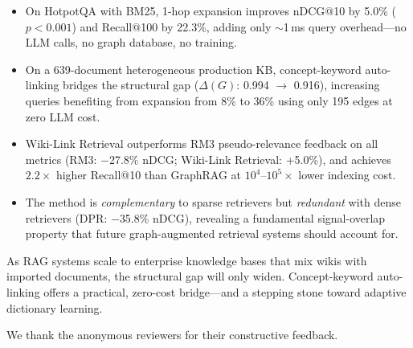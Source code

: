\documentclass[sigconf,review]{acmart}
\newcommand{\sys}{Wiki-Link Retrieval\xspace}
\begin{document}
\begin{itemize}
  \item On HotpotQA with BM25, 1-hop expansion improves nDCG@10 by 5.0\%
($p < 0.001$) and Recall@100 by 22.3\%, adding only ${\sim}$1\,ms
query overhead---no LLM calls, no graph database, no training.

  \item On a 639-document heterogeneous production KB, concept-keyword
auto-linking bridges the structural gap ($\Delta(G)$: 0.994 $\to$ 0.916),
increasing queries benefiting from expansion from 8\% to 36\%
using only 195 edges at zero LLM cost.

  \item \sys outperforms RM3 pseudo-relevance feedback on all metrics
(RM3: $-$27.8\% nDCG; \sys: +5.0\%), and achieves $2.2\times$ higher
Recall@10 than GraphRAG at $10^4$--$10^5\times$ lower indexing cost.

  \item The method is \emph{complementary} to sparse retrievers but
\emph{redundant} with dense retrievers (DPR: $-$35.8\% nDCG),
revealing a fundamental signal-overlap property that future
graph-augmented retrieval systems should account for.
\end{itemize}

As RAG systems scale to enterprise knowledge bases that mix wikis with
imported documents, the structural gap will only widen.  Concept-keyword
auto-linking offers a practical, zero-cost bridge---and a stepping stone
toward adaptive dictionary learning.


\begin{acks}
We thank the anonymous reviewers for their constructive feedback.
\end{acks}



\end{document}
